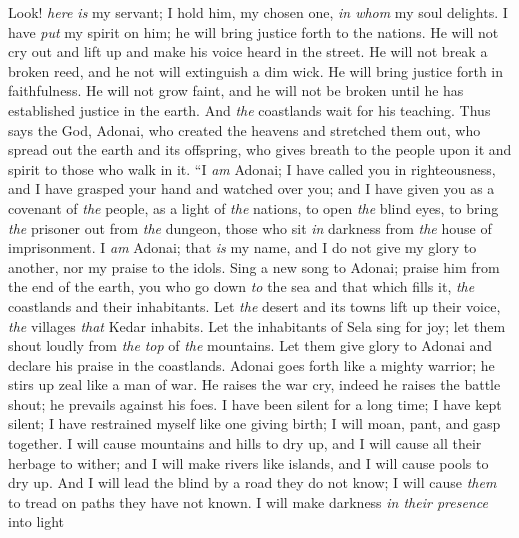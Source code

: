 \begin{biblechapter} %
 Look! \textit{here is} my servant; I hold him, 
my chosen one, \textit{in whom} my soul delights. 
I have \textit{put} my spirit on him; 
he will bring justice forth to the nations.
\verse He will not cry out and lift up 
and make his voice heard in the street.
\verse He will not break a broken reed, 
and he not will extinguish a dim wick. 
He will bring justice forth in faithfulness.
\verse He will not grow faint, 
and he will not be broken 
until he has established justice in the earth. 
And \textit{the} coastlands wait for his teaching.
\verse Thus says the God, Adonai, 
who created the heavens 
and stretched them out, 
who spread out the earth and its offspring, 
who gives breath to the people upon it 
and spirit to those who walk in it.
\verse “I \textit{am} Adonai; I have called you in righteousness, 
and I have grasped your hand and watched over you; 
and I have given you as a covenant of \textit{the} people, 
as a light of \textit{the} nations,
\verse to open \textit{the} blind eyes, 
to bring \textit{the} prisoner out from \textit{the} dungeon, 
those who sit \textit{in} darkness from \textit{the} house of imprisonment.
\verse I \textit{am} Adonai; that \textit{is} my name,
\verse and I do not give my glory to another, 
nor my praise to the idols.
 Sing a new song to Adonai; 
praise him from the end of the earth, 
you who go down \textit{to} the sea and that which fills it, 
\textit{the} coastlands and their inhabitants.
\verse Let \textit{the} desert and its towns lift up their voice, 
\textit{the} villages \textit{that} Kedar inhabits. 
Let the inhabitants of Sela sing for joy; 
let them shout loudly from \textit{the} \textit{top} of \textit{the} mountains.
\verse Let them give glory to Adonai 
and declare his praise in the coastlands.
\verse Adonai goes forth like a mighty warrior; 
he stirs up zeal like a man of war. 
He raises the war cry, indeed he raises the battle shout; 
he prevails against his foes.
\verse I have been silent for a long time; 
I have kept silent; 
I have restrained myself like one giving birth; 
I will moan, pant, and gasp together.
\verse I will cause mountains and hills to dry up, 
and I will cause all their herbage to wither; 
and I will make rivers like islands, 
and I will cause pools to dry up.
\verse And I will lead the blind by a road they do not know; 
I will cause \textit{them} to tread on paths they have not known. 
I will make darkness \textit{in their presence} into light 

\end{biblechapter}

